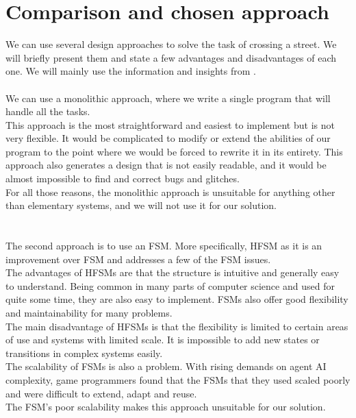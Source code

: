 \section{Comparison and chosen approach}
    We can use several design approaches to solve the task of crossing a street. We will briefly present them and state a few advantages and disadvantages of each one. We will mainly use the information and insights from \cite{BT_intro}.\\
    \\
        We can use a monolithic approach, where we write a single program that will handle all the tasks.\\
        This approach is the most straightforward and easiest to implement but is not very flexible. It would be complicated to modify or extend the abilities of our program to the point where we would be forced to rewrite it in its entirety. This approach also generates a design that is not easily readable, and it would be almost impossible to find and correct bugs and glitches.\\
        For all those reasons, the monolithic approach is unsuitable for anything other than elementary systems, and we will not use it for our solution.\\\\
    \\
        The second approach is to use an FSM. More specifically, HFSM as it is an improvement over FSM and addresses a few of the FSM issues.\\
        The advantages of HFSMs are that the structure is intuitive and generally easy to understand. Being common in many parts of computer science and used for quite some time, they are also easy to implement. FSMs also offer good flexibility and maintainability for many problems.\\
        The main disadvantage of HFSMs is that the flexibility is limited to certain areas of use and systems with limited scale. It is impossible to add new states or transitions in complex systems easily.\\
        The scalability of FSMs is also a problem. With rising demands on agent AI complexity, game programmers found that the FSMs that they used scaled poorly and were difficult to extend, adapt and reuse.\cite{BT_survey}\\
        The FSM's poor scalability makes this approach unsuitable for our solution.\\\\
